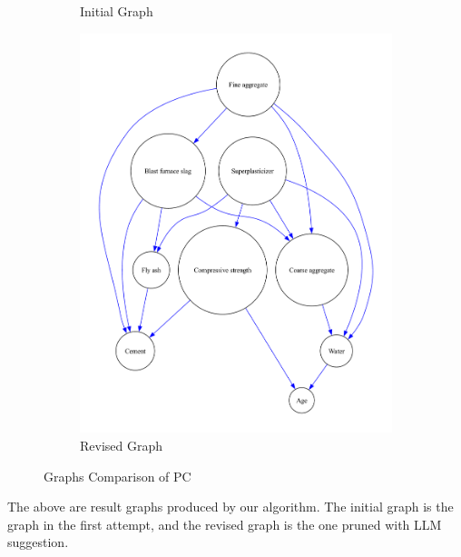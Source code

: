 \documentclass{article}
\begin{document}
\begin{figure}[H]
\begin{subfigure}{0.3\textwidth}
        \vfill
        \caption{Initial Graph}
        \label{fig:sub2}
    \end{subfigure}
    \hspace{0.04\textwidth}
    \begin{subfigure}{0.3\textwidth}
        \centering
        \vspace{-0.5cm}
        \includegraphics[width=\linewidth]{data/dataset/CCS_Data/output_graph/revised_graph.pdf}
        \vfill
        \caption{Revised Graph}
        \label{fig:sub3}
    \end{subfigure}
    \caption{Graphs Comparison of PC}
    \label{fig:main}
\end{figure}

The above are result graphs produced by our algorithm.
The initial graph is the graph in the first attempt, and the revised graph is the one pruned with LLM suggestion.
\end{document}
